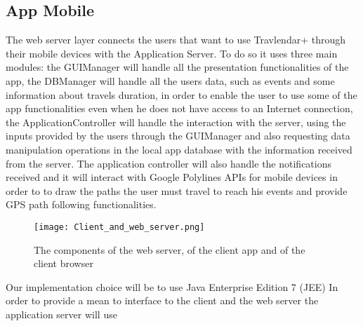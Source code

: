 \subsection{App Mobile}
\label{subsect:App Mobile}
	The web server layer connects the users that want to use Travlendar+ through their mobile devices with the Application Server.
	To do so it uses three main modules: the GUIManager will handle all the presentation functionalities of the app, the DBManager will handle all the users data, such as events and some information about travels duration, in order to enable the user to use some of the app functionalities even when he does not have access to an Internet connection, the ApplicationController will handle the interaction with the server, using the inputs provided by the users through the GUIManager and also requesting data manipulation operations in the local app database with the information received from the server. The application controller will also handle the notifications received and it will interact with Google Polylines APIs for mobile devices in order to to draw the paths the user must travel to reach his events and provide GPS path following functionalities.
	
\begin{figure}[H]
\begin{center}
		\hspace*{-0pt}
		\texttt{[image: Client\_and\_web\_server.png]}
\end{center}
\caption{The components of the web server, of the client app and of the client browser}
\end{figure}
Our implementation choice will be to use Java Enterprise Edition 7 (JEE)
In order to provide a mean to interface to the client and the web server the application server will use 